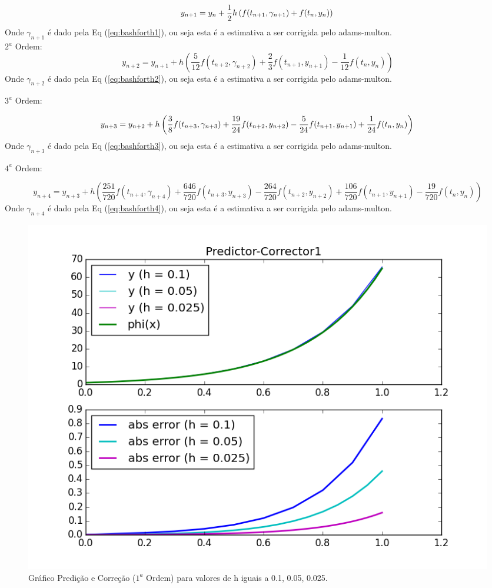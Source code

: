 \documentclass[a4paper]{article}
\begin{document}
\begin{dmath}
\label{eq:pc1}
y_{n+1} = y_n + \frac{1}{2} h \left( f(t_{n+1},\gamma_{n+1}) + f(t_n,y_n) \right) \\
\end{dmath}
Onde $\gamma_{n+1}$ é dado pela Eq (\ref{eq:bashforth1}), ou seja esta é a estimativa a ser corrigida pelo adams-multon.
\\
$2^a$ Ordem: 
\begin{dmath}
\label{eq:pc2}
y_{n+2} = y_{n+1} + h \left( \frac{5}{12} f(t_{n+2},\gamma_{n+2}) + \frac{2}{3} f(t_{n+1},y_{n+1}) - \frac{1}{12} f(t_n,y_n) \right)
\end{dmath}
Onde $\gamma_{n+2}$ é dado pela Eq (\ref{eq:bashforth2}), ou seja esta é a estimativa a ser corrigida pelo adams-multon.

$3^a$ Ordem: 

\begin{dmath}
\label{eq:pc3}
y_{n+3} = y_{n+2} + h \left( \frac{3}{8} f(t_{n+3},\gamma_{n+3}) + \frac{19}{24} f(t_{n+2},y_{n+2}) - \frac{5}{24} f(t_{n+1},y_{n+1}) + \frac{1}{24} f(t_n,y_n) \right) \\
\end{dmath}
Onde $\gamma_{n+3}$ é dado pela Eq (\ref{eq:bashforth3}), ou seja esta é a estimativa a ser corrigida pelo adams-multon.

$4^a$ Ordem: 

\begin{dmath}
\label{eq:pc4}
y_{n+4} = y_{n+3} + h \left( \frac{251}{720} f(t_{n+4},\gamma_{n+4}) + \frac{646}{720} f(t_{n+3},y_{n+3}) - \frac{264}{720} f(t_{n+2},y_{n+2}) + \frac{106}{720} f(t_{n+1},y_{n+1}) - \frac{19}{720} f(t_n,y_n) \right)
\end{dmath}
Onde $\gamma_{n+4}$ é dado pela Eq (\ref{eq:bashforth4}), ou seja esta é a estimativa a ser corrigida pelo adams-multon.

\begin{figure}[!htb]
\centering
\includegraphics[width=1.0\textwidth]{plots/Predictor-Corrector1.png}
\caption{\label{fig:pc1}Gráfico Predição e Correção ($1^a$ Ordem) para valores de h iguais a 0.1, 0.05, 0.025.}
\end{figure}
\end{document}
